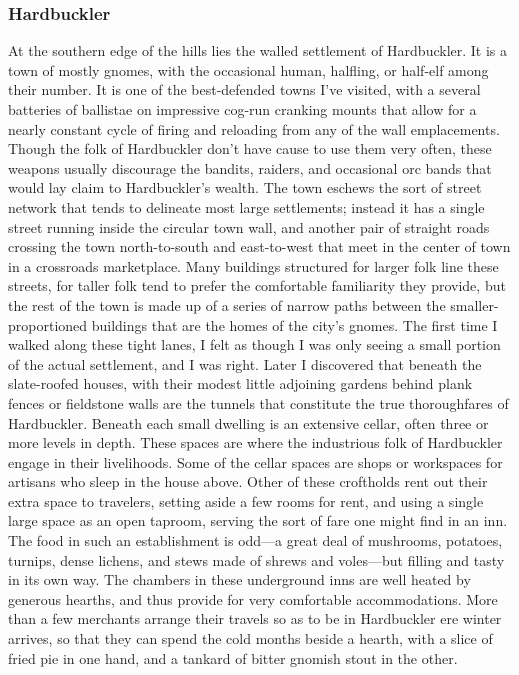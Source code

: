 \documentclass[10pt,a4paper,twoside,twocolumn,openany,bg=print,nodeprecatedcode]{dndbook}
\begin{document}
\subsubsection{Hardbuckler}
At the southern edge of the hills lies the walled settlement of Hardbuckler. It is a town of mostly gnomes, with the occasional human, halfling, or half-elf among their number. It is one of the best-defended towns I've visited, with a several batteries of ballistae on impressive cog-run cranking mounts that allow for a nearly constant cycle of firing and reloading from any of the wall emplacements. Though the folk of Hardbuckler don't have cause to use them very often, these weapons usually discourage the bandits, raiders, and occasional orc bands that would lay claim to Hardbuckler's wealth.
The town eschews the sort of street network that tends to delineate most large settlements; instead it has a single street running inside the circular town wall, and another pair of straight roads crossing the town north-to-south and east-to-west that meet in the center of town in a crossroads marketplace. Many buildings structured for larger folk line these streets, for taller folk tend to prefer the comfortable familiarity they provide, but the rest of the town is made up of a series of narrow paths between the smaller-proportioned buildings that are the homes of the city's gnomes.
The first time I walked along these tight lanes, I felt as though I was only seeing a small portion of the actual settlement, and I was right. Later I discovered that beneath the slate-roofed houses, with their modest little adjoining gardens behind plank fences or fieldstone walls are the tunnels that constitute the true thoroughfares of Hardbuckler.
Beneath each small dwelling is an extensive cellar, often three or more levels in depth. These spaces are where the industrious folk of Hardbuckler engage in their livelihoods. Some of the cellar spaces are shops or workspaces for artisans who sleep in the house above. Other of these croftholds rent out their extra space to travelers, setting aside a few rooms for rent, and using a single large space as an open taproom, serving the sort of fare one might find in an inn. The food in such an establishment is odd—a great deal of mushrooms, potatoes, turnips, dense lichens, and stews made of shrews and voles—but filling and tasty in its own way.
The chambers in these underground inns are well heated by generous hearths, and thus provide for very comfortable accommodations. More than a few merchants arrange their travels so as to be in Hardbuckler ere winter arrives, so that they can spend the cold months beside a hearth, with a slice of fried pie in one hand, and a tankard of bitter gnomish stout in the other.
\end{document}
